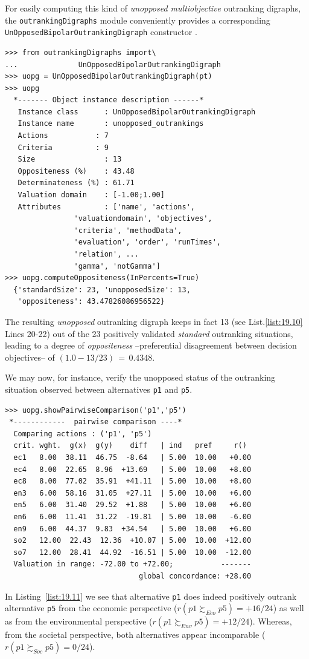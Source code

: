 For easily computing this kind of \emph{unopposed multiobjective} outranking digraphs, the \texttt{outrankingDigraphs} module conveniently provides a corresponding\\ \texttt{UnOpposedBipolarOutrankingDigraph} constructor .
\begin{lstlisting}[caption={Computing unopposed outranking digraphs},label=list:19.10]
>>> from outrankingDigraphs import\
...              UnOpposedBipolarOutrankingDigraph
>>> uopg = UnOpposedBipolarOutrankingDigraph(pt)
>>> uopg
  *------- Object instance description ------*
   Instance class      : UnOpposedBipolarOutrankingDigraph
   Instance name       : unopposed_outrankings
   Actions           : 7
   Criteria          : 9
   Size                : 13
   Oppositeness (%)    : 43.48
   Determinateness (%) : 61.71
   Valuation domain    : [-1.00;1.00]
   Attributes          : ['name', 'actions',
                'valuationdomain', 'objectives',
                'criteria', 'methodData',
                'evaluation', 'order', 'runTimes',
                'relation', ...
                'gamma', 'notGamma']
>>> uopg.computeOppositeness(InPercents=True)
  {'standardSize': 23, 'unopposedSize': 13,
   'oppositeness': 43.47826086956522}			   
\end{lstlisting}
The resulting \emph{unopposed} outranking digraph keeps in fact 13 (see List.\vref{list:19.10} Lines 20-22) out of the 23 positively validated \emph{standard} outranking situations, leading to a degree of \emph{oppositeness} --preferential disagreement between decision objectives-- of $(1.0 - 13/23)\,=\,0.4348$.

We may now, for instance, verify the unopposed status of the outranking situation observed between alternatives \texttt{p1} and \texttt{p5}.
\begin{lstlisting}[caption={Example of unopposed multiobjective outranking situation},label=list:19.11]
>>> uopg.showPairwiseComparison('p1','p5')
 *------------  pairwise comparison ----*
  Comparing actions : ('p1', 'p5')
  crit. wght.  g(x)  g(y)    diff   | ind   pref     r()
  ec1   8.00  38.11  46.75  -8.64   | 5.00  10.00   +0.00
  ec4   8.00  22.65  8.96  +13.69   | 5.00  10.00   +8.00
  ec8   8.00  77.02  35.91  +41.11  | 5.00  10.00   +8.00
  en3   6.00  58.16  31.05  +27.11  | 5.00  10.00   +6.00
  en5   6.00  31.40  29.52  +1.88   | 5.00  10.00   +6.00
  en6   6.00  11.41  31.22  -19.81  | 5.00  10.00   -6.00
  en9   6.00  44.37  9.83  +34.54   | 5.00  10.00   +6.00
  so2   12.00  22.43  12.36  +10.07 | 5.00  10.00  +12.00
  so7   12.00  28.41  44.92  -16.51 | 5.00  10.00  -12.00
  Valuation in range: -72.00 to +72.00;           -------
                               global concordance: +28.00
\end{lstlisting}
In Listing~\vref{list:19.11} we see that alternative \texttt{p1} does indeed positively outrank alternative \texttt{p5} from the economic perspective ($r(p1 \succsim_{Eco} p5) = +16/24$) as well as from the environmental perspective ($r(p1 \succsim_{Env} p5) = +12/24$). Whereas, from the societal perspective, both alternatives appear incomparable ($r(p1 \succsim_{Soc} p5) = 0/24$).

